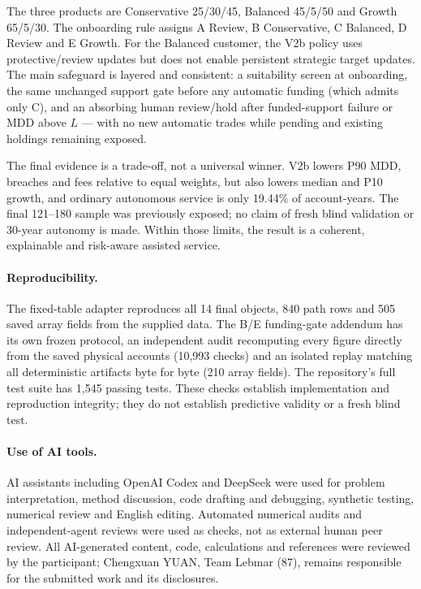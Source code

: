 \documentclass[11pt,a4paper]{article}
\begin{document}
The three products are Conservative 25/30/45, Balanced 45/5/50 and Growth 65/5/30.
The onboarding rule assigns A Review, B Conservative, C Balanced, D Review and E
Growth. For the Balanced customer, the V2b policy uses protective/review updates
but does not enable persistent strategic target updates. The main safeguard is
layered and consistent: a suitability screen at onboarding, the same unchanged
support gate before any automatic funding (which admits only C), and an absorbing
human review/hold after funded-support failure or MDD above $L$ --- with no new
automatic trades while pending and existing holdings remaining exposed.

The final evidence is a trade-off, not a universal winner. V2b lowers P90 MDD,
breaches and fees relative to equal weights, but also lowers median and P10
growth, and ordinary autonomous service is only 19.44\% of account-years. The
final 121--180 sample was previously exposed; no claim of fresh blind validation
or 30-year autonomy is made. Within those limits, the result is a coherent,
explainable and risk-aware assisted service.

\paragraph{Reproducibility.}
The fixed-table adapter reproduces all 14 final objects, 840 path rows and 505
saved array fields from the supplied data. The B/E funding-gate addendum has its
own frozen protocol, an independent audit recomputing every figure directly from
the saved physical accounts (10{,}993 checks) and an isolated replay matching all
deterministic artifacts byte for byte (210 array fields). The repository's full
test suite has 1{,}545 passing tests. These checks establish implementation and
reproduction integrity; they do not establish predictive validity or a fresh
blind test.

\paragraph{Use of AI tools.}
AI assistants including OpenAI Codex and DeepSeek were used for problem
interpretation, method discussion, code drafting and debugging, synthetic
testing, numerical review and English editing. Automated numerical audits and
independent-agent reviews were used as checks, not as external human peer review.
All AI-generated content, code, calculations and references were reviewed by the
participant; Chengxuan YUAN, Team Lebmar (87), remains responsible for the
submitted work and its disclosures.
\end{document}
